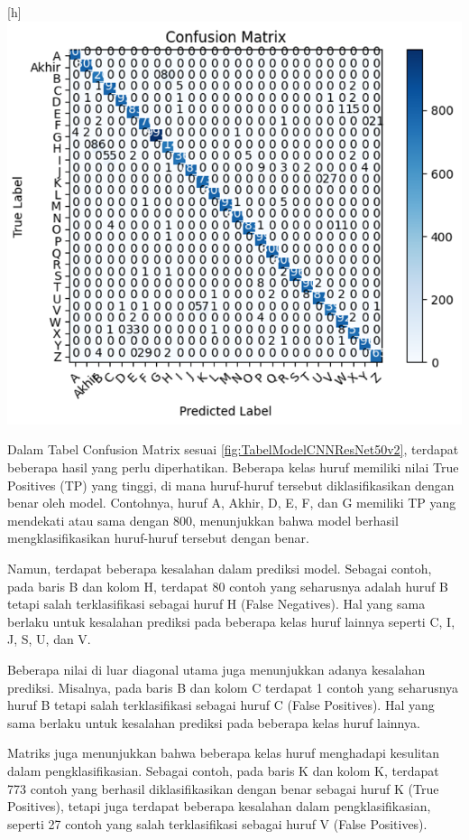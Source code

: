 \begin{center}[h]
	\includegraphics[width=0.7\linewidth]{gambar/bener/ConfusionMatrix_ModelCNNResNet50V2.png}
	\label{fig:TabelModelCNNResNet50v2}
\end{center}
Dalam Tabel Confusion Matrix sesuai \ref{fig:TabelModelCNNResNet50v2}, terdapat beberapa hasil yang perlu diperhatikan. Beberapa kelas huruf memiliki nilai True Positives (TP) yang tinggi, di mana huruf-huruf tersebut diklasifikasikan dengan benar oleh model. Contohnya, huruf A, Akhir, D, E, F, dan G memiliki TP yang mendekati atau sama dengan 800, menunjukkan bahwa model berhasil mengklasifikasikan huruf-huruf tersebut dengan benar.

Namun, terdapat beberapa kesalahan dalam prediksi model. Sebagai contoh, pada baris B dan kolom H, terdapat 80 contoh yang seharusnya adalah huruf B tetapi salah terklasifikasi sebagai huruf H (False Negatives). Hal yang sama berlaku untuk kesalahan prediksi pada beberapa kelas huruf lainnya seperti C, I, J, S, U, dan V.

Beberapa nilai di luar diagonal utama juga menunjukkan adanya kesalahan prediksi. Misalnya, pada baris B dan kolom C terdapat 1 contoh yang seharusnya huruf B tetapi salah terklasifikasi sebagai huruf C (False Positives). Hal yang sama berlaku untuk kesalahan prediksi pada beberapa kelas huruf lainnya.

Matriks juga menunjukkan bahwa beberapa kelas huruf menghadapi kesulitan dalam pengklasifikasian. Sebagai contoh, pada baris K dan kolom K, terdapat 773 contoh yang berhasil diklasifikasikan dengan benar sebagai huruf K (True Positives), tetapi juga terdapat beberapa kesalahan dalam pengklasifikasian, seperti 27 contoh yang salah terklasifikasi sebagai huruf V (False Positives).

